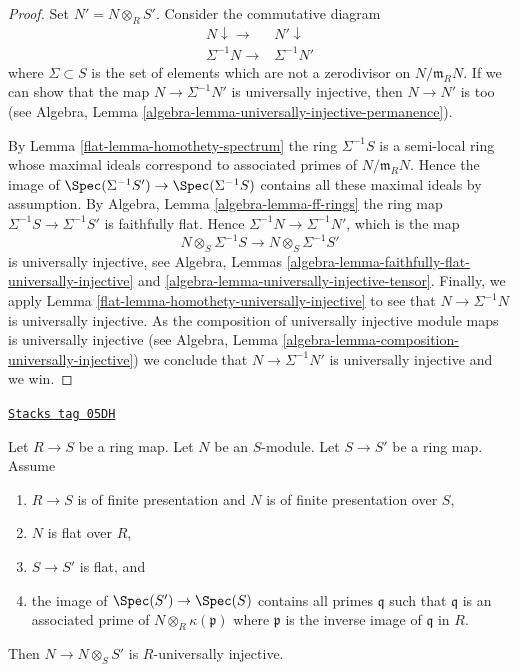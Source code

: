 \begin{proof}

Set $N' = N \otimes_R S'$. Consider the commutative diagram
$$
\begin{array}{cc}N \downarrow\longrightarrow & N' \downarrow \\ \Sigma^{-1}N \longrightarrow & \Sigma^{-1}N'\end{array}
$$
where $\Sigma \subset S$ is the set of elements which are not a
zerodivisor on $N/\mathfrak m_R N$. If we can show that the map
$N \to \Sigma^{-1}N'$ is universally injective, then $N \to N'$
is too (see
Algebra, Lemma \ref{algebra-lemma-universally-injective-permanence}).

\medskip\noindent
By
Lemma \ref{flat-lemma-homothety-spectrum}
the ring $\Sigma^{-1}S$ is a semi-local ring whose maximal ideals
correspond to associated primes of $N/\mathfrak m_R N$.
Hence the image of
$\Spec(\Sigma^{-1}S') \to \Spec(\Sigma^{-1}S)$
contains all these maximal ideals by assumption. By
Algebra, Lemma \ref{algebra-lemma-ff-rings}
the ring map $\Sigma^{-1}S \to \Sigma^{-1}S'$ is faithfully flat.
Hence $\Sigma^{-1}N \to \Sigma^{-1}N'$, which is the map
$$
N \otimes_S \Sigma^{-1}S \longrightarrow N \otimes_S \Sigma^{-1}S'
$$
is universally injective, see
Algebra, Lemmas \ref{algebra-lemma-faithfully-flat-universally-injective} and
\ref{algebra-lemma-universally-injective-tensor}.
Finally, we apply
Lemma \ref{flat-lemma-homothety-universally-injective}
to see that $N \to \Sigma^{-1}N$ is universally injective.
As the composition of universally injective module maps is universally
injective (see
Algebra, Lemma \ref{algebra-lemma-composition-universally-injective})
we conclude that $N \to \Sigma^{-1}N'$ is universally injective and we win.
\end{proof}

\begin{lemma}
\label{flat-lemma-base-change-universally-flat}
\href{https://stacks.math.columbia.edu/tag/05DH}{\texttt{Stacks tag 05DH}}

Let $R \to S$ be a ring map.
Let $N$ be an $S$-module.
Let $S \to S'$ be a ring map.
Assume
\begin{enumerate}
\item $R \to S$ is of finite presentation and $N$ is of finite presentation
over $S$,
\item $N$ is flat over $R$,
\item $S \to S'$ is flat, and
\item the image of $\Spec(S') \to \Spec(S)$ contains
all primes $\mathfrak q$ such that $\mathfrak q$ is an associated prime
of $N \otimes_R \kappa(\mathfrak p)$ where $\mathfrak p$ is the inverse
image of $\mathfrak q$ in $R$.
\end{enumerate}
Then $N \to N \otimes_S S'$ is $R$-universally injective.
\end{lemma}

